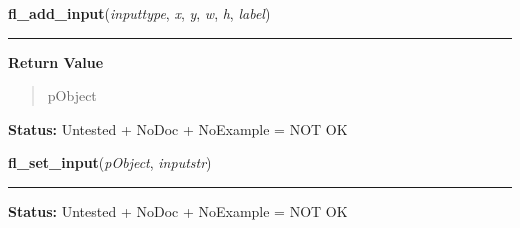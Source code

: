     \label{xformslib:library:fl_add_input}

    \vspace{0.5ex}

\hspace{.8\funcindent}\begin{boxedminipage}{\funcwidth}

    \raggedright \textbf{fl\_add\_input}(\textit{inputtype}, \textit{x}, \textit{y}, \textit{w}, \textit{h}, \textit{label})

    \vspace{-1.5ex}

    \rule{\textwidth}{0.5\fboxrule}
\setlength{\parskip}{2ex}
\setlength{\parskip}{1ex}
      \textbf{Return Value}
    \vspace{-1ex}

      \begin{quote}
      pObject

      \end{quote}

\textbf{Status:} Untested + NoDoc + NoExample = NOT OK



    \end{boxedminipage}

    \label{xformslib:library:fl_set_input}

    \vspace{0.5ex}

\hspace{.8\funcindent}\begin{boxedminipage}{\funcwidth}

    \raggedright \textbf{fl\_set\_input}(\textit{pObject}, \textit{inputstr})

    \vspace{-1.5ex}

    \rule{\textwidth}{0.5\fboxrule}
\setlength{\parskip}{2ex}
\setlength{\parskip}{1ex}
\textbf{Status:} Untested + NoDoc + NoExample = NOT OK



    \end{boxedminipage}

    \label{xformslib:library:fl_set_input_return}

